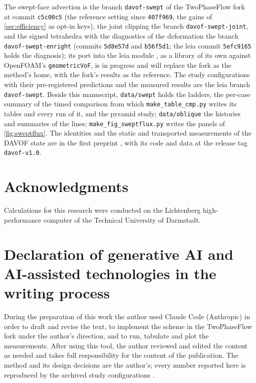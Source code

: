 \documentclass[preprint,12pt]{elsarticle}
\begin{document}
The swept-face advection is the branch \texttt{davof-swept} of the TwoPhaseFlow fork \citep{TwoPhaseFlowFork2026} at commit \texttt{c5c00c5} (the reference setting since \texttt{407f969}, the gains of \cref{sec:efficiency} as opt-in keys), the joint clipping the branch \texttt{davof-swept-joint}, and the signed tetrahedra with the diagnostics of the deformation the branch \texttt{davof-swept-enright} (commits \texttt{5d8e57d} and \texttt{b56f5d1}; the leia commit \texttt{5efc9165} holds the diagnosis); its port into the leia module \citep{LeiaRepo2026}, as a library of its own against OpenFOAM's \texttt{geometricVoF}, is in progress and will replace the fork as the method's home, with the fork's results as the reference. The study configurations with their pre-registered predictions and the measured results are the leia branch \texttt{davof-swept}. Beside this manuscript, \texttt{data/swept} holds the ladders, the per-case summary of the timed comparison from which \texttt{make\_table\_cmp.py} writes its tables and every run of it, and the pyramid study; \texttt{data/oblique} the histories and summaries of the lines; \texttt{make\_fig\_sweptflux.py} writes the panels of \cref{fig:sweptflux}. The identities and the static and transported measurements of the DAVOF state are in the first preprint \citep{MaricDAVOF2026}, with its code and data at the release tag \texttt{davof-v1.0}.

\section*{Acknowledgments}

Calculations for this research were conducted on the Lichtenberg high-performance computer of the Technical University of Darmstadt.

\section*{Declaration of generative AI and AI-assisted technologies in the writing process}

During the preparation of this work the author used Claude Code (Anthropic) in order to draft and revise the text, to implement the scheme in the TwoPhaseFlow fork under the author's direction, and to run, tabulate and plot the measurements. After using this tool, the author reviewed and edited the content as needed and takes full responsibility for the content of the publication. The method and its design decisions are the author's; every number reported here is reproduced by the archived study configurations \citep{LeiaRepo2026,TwoPhaseFlowFork2026}.



\end{document}
